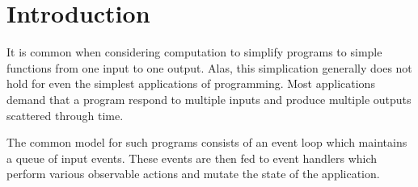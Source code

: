\chapter{Introduction}
\label{chapter:Introduction}

It is common when considering computation to simplify programs to simple
functions from one input to one output. Alas, this simplication generally does
not hold for even the simplest applications of programming. Most applications
demand that a program respond to multiple inputs and produce multiple outputs
scattered through time. 

The common model for such programs consists of an event loop which maintains a
queue of input events. These events are then fed to event handlers which perform
various observable actions and mutate the state of the application.